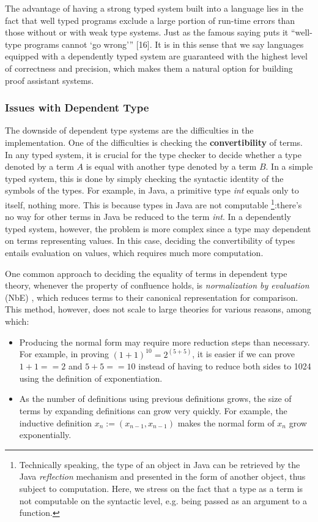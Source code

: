 \documentclass{article}
\theoremstyle{remark}
\begin{document}
The advantage of having a strong typed system built into a language lies in the fact that well typed programs exclude a large portion of run-time errors than those without or with weak type systems. Just as the famous saying puts it “well-type programs cannot ‘go wrong’” [16]. It is in this sense that we say languages equipped with a dependently typed system are guaranteed with the highest level of correctness and precision, which makes them a natural option for building proof assistant systems.

\subsubsection{Issues with Dependent Type}
The downside of dependent type systems are the difficulties in the implementation. One of the difficulties is checking the \textbf{convertibility} of terms. In any typed system, it is crucial for the type checker to decide whether a type denoted by a term $A$ is equal with another type denoted by a term $B$. In a simple typed system, this is done by simply checking the syntactic identity of the symbols of the types. For example, in Java, a primitive type \emph{int} equals only to itself, nothing more. This is because types in Java are not computable \footnote{Technically speaking, the type of an object in Java can be retrieved by the Java \emph{reflection} mechanism and presented in the form of another object, thus subject to computation. Here, we stress on the fact that a type as a term is not computable on the syntactic level, e.g. being passed as an argument to a function.}:there's no way for other terms in Java be reduced to the term \emph{int}. In a dependently typed system, however, the problem is more complex since a type may dependent on terms representing values. In this case, deciding the convertibility of types entails evaluation on values, which requires much more computation.

One common approach to deciding the equality of terms in dependent type theory, whenever the property of confluence holds, is \textit{normalization by evaluation} (NbE) \cite{berger1998normalization}, which reduces terms to their canonical representation for comparison. This method, however, does not scale to large theories for various reasons, among which:
\begin{itemize}
\item Producing the normal form may require more reduction steps than necessary. For example, in proving $(1 + 1) ^ {10} = 2 ^{(5 + 5)}$, it is easier if we can prove $1 + 1 == 2$ and $5 + 5 == 10$ instead of having to reduce both sides to 1024 using the definition of exponentiation.
\item As the number of definitions using previous definitions grows, the size of terms by expanding definitions can grow very quickly. For example, the inductive definition $x_n := (x_{n-1}, x_{n-1})$ makes the normal form of $x_{n}$ grow exponentially.
\end{itemize}
\end{document}

